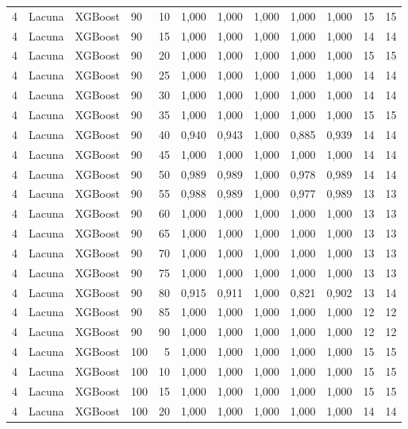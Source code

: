 \begin{longtable}{ccclrrrrrrrr}
4 & Lacuna & XGBoost & 90 & 10 & 1,000 & 1,000 & 1,000 & 1,000 & 1,000 & 15 & 15 \\
4 & Lacuna & XGBoost & 90 & 15 & 1,000 & 1,000 & 1,000 & 1,000 & 1,000 & 14 & 14 \\
4 & Lacuna & XGBoost & 90 & 20 & 1,000 & 1,000 & 1,000 & 1,000 & 1,000 & 15 & 15 \\
4 & Lacuna & XGBoost & 90 & 25 & 1,000 & 1,000 & 1,000 & 1,000 & 1,000 & 14 & 14 \\
4 & Lacuna & XGBoost & 90 & 30 & 1,000 & 1,000 & 1,000 & 1,000 & 1,000 & 14 & 14 \\
4 & Lacuna & XGBoost & 90 & 35 & 1,000 & 1,000 & 1,000 & 1,000 & 1,000 & 15 & 15 \\
4 & Lacuna & XGBoost & 90 & 40 & 0,940 & 0,943 & 1,000 & 0,885 & 0,939 & 14 & 14 \\
4 & Lacuna & XGBoost & 90 & 45 & 1,000 & 1,000 & 1,000 & 1,000 & 1,000 & 14 & 14 \\
4 & Lacuna & XGBoost & 90 & 50 & 0,989 & 0,989 & 1,000 & 0,978 & 0,989 & 14 & 14 \\
4 & Lacuna & XGBoost & 90 & 55 & 0,988 & 0,989 & 1,000 & 0,977 & 0,989 & 13 & 13 \\
4 & Lacuna & XGBoost & 90 & 60 & 1,000 & 1,000 & 1,000 & 1,000 & 1,000 & 13 & 13 \\
4 & Lacuna & XGBoost & 90 & 65 & 1,000 & 1,000 & 1,000 & 1,000 & 1,000 & 13 & 13 \\
4 & Lacuna & XGBoost & 90 & 70 & 1,000 & 1,000 & 1,000 & 1,000 & 1,000 & 13 & 13 \\
4 & Lacuna & XGBoost & 90 & 75 & 1,000 & 1,000 & 1,000 & 1,000 & 1,000 & 13 & 13 \\
4 & Lacuna & XGBoost & 90 & 80 & 0,915 & 0,911 & 1,000 & 0,821 & 0,902 & 13 & 14 \\
4 & Lacuna & XGBoost & 90 & 85 & 1,000 & 1,000 & 1,000 & 1,000 & 1,000 & 12 & 12 \\
4 & Lacuna & XGBoost & 90 & 90 & 1,000 & 1,000 & 1,000 & 1,000 & 1,000 & 12 & 12 \\
4 & Lacuna & XGBoost & 100 & 5 & 1,000 & 1,000 & 1,000 & 1,000 & 1,000 & 15 & 15 \\
4 & Lacuna & XGBoost & 100 & 10 & 1,000 & 1,000 & 1,000 & 1,000 & 1,000 & 15 & 15 \\
4 & Lacuna & XGBoost & 100 & 15 & 1,000 & 1,000 & 1,000 & 1,000 & 1,000 & 15 & 15 \\
4 & Lacuna & XGBoost & 100 & 20 & 1,000 & 1,000 & 1,000 & 1,000 & 1,000 & 14 & 14 \\

\end{longtable}
